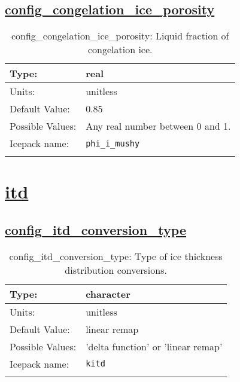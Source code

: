 \subsection[config\_congelation\_ice\_porosity]{\hyperref[sec:nm_tab_thermodynamics]{config\_congelation\_ice\_porosity}}
\label{subsec:nm_sec_config_congelation_ice_porosity}
\begin{center}
\begin{longtable}{| p{2.0in} || p{4.0in} |}
    \hline
    Type: & real \\
    \hline
    Units: & \si{unitless} \\
    \hline
    Default Value: & 0.85 \\
    \hline
    Possible Values: & Any real number between 0 and 1. \\
    \hline
    \hline
    Icepack name: & \verb+phi_i_mushy+ \\
    \caption{config\_congelation\_ice\_porosity: Liquid fraction of congelation ice.}
\end{longtable}
\end{center}
\section[itd]{\hyperref[sec:nm_tab_itd]{itd}}
\label{sec:nm_sec_itd}
\subsection[config\_itd\_conversion\_type]{\hyperref[sec:nm_tab_itd]{config\_itd\_conversion\_type}}
\label{subsec:nm_sec_config_itd_conversion_type}
\begin{center}
\begin{longtable}{| p{2.0in} || p{4.0in} |}
    \hline
    Type: & character \\
    \hline
    Units: & \si{unitless} \\
    \hline
    Default Value: & linear remap \\
    \hline
    Possible Values: & 'delta function' or 'linear remap' \\
    \hline
    \hline
    Icepack name: & \verb+kitd+ \\
    \caption{config\_itd\_conversion\_type: Type of ice thickness distribution conversions.}
\end{longtable}
\end{center}
